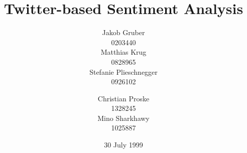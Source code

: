 \documentclass{acm_proc_article-sp}
\begin{document}
\title{Twitter-based Sentiment Analysis}

%
%
%
%
%

%
\author{
%
%
\alignauthor Jakob Gruber\\
      0203440\\
       \email{}
\alignauthor Matthias Krug\\
      0828965\\
       \email{}
\alignauthor Stefanie Plieschnegger\\
      0926102\\
\and  %
\alignauthor Christian Proske\\
	 1328245 \\
       \email{}
\alignauthor Mino Sharkhawy  \\
      1025887 \\
       \email{}
}
\date{30 July 1999}
\end{document}
